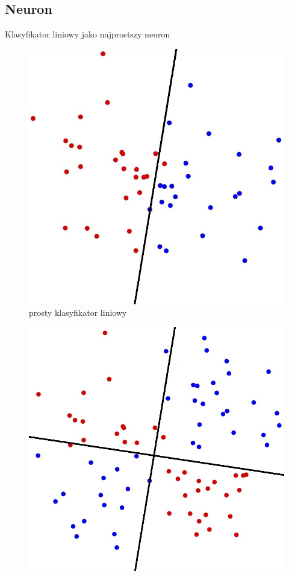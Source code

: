 \documentclass[xcolor=dvipsnames]{beamer}
\begin{document}
\subsection{Neuron}
\begin{frame}{Klasyfikator liniowy jako najprostszy neuron}
	\begin{minipage}[t]{0.45\linewidth}
		\vfill
		\begin{figure}
			\includegraphics[height=0.6\textheight,frame]{img/linear_classifier.jpg}
			\caption{prosty klasyfikator liniowy}
		\end{figure}	
	\end{minipage}%
	\hfill
	\begin{minipage}[t]{0.45\linewidth}
		\vfill
		\begin{figure}
			\includegraphics[height=0.6\textheight,frame]{img/xor_classifier.jpg}

\end{figure}
\end{minipage}
\end{frame}
\end{document}
